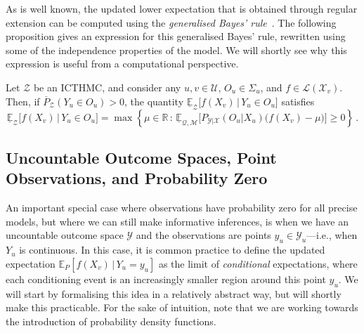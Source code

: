 \documentclass[twoside,11pt]{article}
\newcommand{\reals}{\mathbb{R}}
\newcommand{\states}{\mathcal{X}}
\newcommand{\observs}{\mathcal{Y}}
\newcommand{\lexp}{\underline{\mathbb{E}}_{\rateset,\mathcal{M}}}
\newcommand{\gambles}{\mathcal{L}}
\newcommand{\rateset}{\mathcal{Q}}
\begin{document}
As is well known, the updated lower expectation that is obtained through regular extension can be computed using the \emph{generalised Bayes' rule}~\citep{Walley:1991vk}. The following proposition gives an expression for this generalised Bayes' rule, rewritten using some of the independence properties of the model. We will shortly see why this expression is useful from a computational perspective.
\begin{proposition}\label{prop:GBR_regular}
Let $\mathcal{Z}$ be an ICTHMC, and consider any $u,v\in\mathcal{U}$, $O_u\in\Sigma_u$, and $f\in\gambles(\states_v)$. Then, if $\overline{P}_\mathcal{Z}(Y_u\in O_u) > 0$, the quantity $\underline{\mathbb{E}}_{\mathcal{Z}}\bigl[f(X_v)\,\vert\,Y_u\in O_u\bigr]$ satisfies
\begin{equation*}
\underline{\mathbb{E}}_{\mathcal{Z}}\bigl[f(X_v)\,\vert\,Y_u\in O_u\bigr] = \max\left\{\mu\in\reals\,:\, \lexp\bigl[P_{\observs\vert\states}(O_u\vert X_u)\bigl(f(X_v) - \mu\bigr)\bigr] \geq 0\right\}\,.
\end{equation*}
\end{proposition}

\subsection{Uncountable Outcome Spaces, Point Observations, and Probability Zero}\label{subsec:uncountable}

An important special case where observations have probability zero for all precise models, but where we can still make informative inferences, is when we have an uncountable outcome space $\observs$ and the observations are points $y_u\in\observs_u$---i.e., when $Y_u$ is continuous. In this case, it is common practice to define the updated expectation $\mathbb{E}_P[f(X_v)\,\vert\,Y_u=y_u]$ as the limit of \emph{conditional} expectations, where each conditioning event is an increasingly smaller region around this point $y_u$. We will start by formalising this idea in a relatively abstract way, but will shortly make this practicable. For the sake of intuition, note that we are working towards the introduction of probability density functions.
\end{document}
